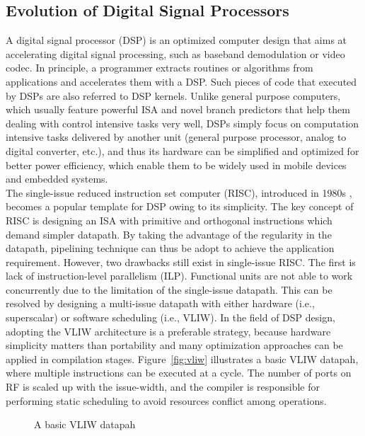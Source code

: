 \documentclass[12pt]{article}
\begin{document}
\begin{CJK}{UTF8}{bkai}
    \subsection{Evolution of Digital Signal Processors}
        A digital signal processor (DSP) is an optimized computer design that aims at accelerating digital signal processing, such as baseband demodulation or video codec.
        In principle, a programmer extracts routines or algorithms from applications and accelerates them with a DSP.
        Such pieces of code that executed by DSPs are also referred to DSP kernels.
        Unlike general purpose computers, which usually feature powerful ISA and novel branch predictors that help them dealing with control intensive tasks very well,
        DSPs simply focus on computation intensive tasks delivered by another unit (general purpose processor, analog to digital converter, etc.), 
        and thus its hardware can be simplified and optimized for better power efficiency, which enable them to be widely used in mobile devices and embedded systems.
        \\
        The single-issue reduced instruction set computer (RISC), introduced in 1980s \cite{risc}, becomes a popular template for DSP owing to its simplicity.
        The key concept of RISC is designing an ISA with primitive and orthogonal instructions which demand simpler datapath.
        By taking the advantage of the regularity in the datapath, pipelining technique can thus be adopt to achieve the application requirement.
        However, two drawbacks still exist in single-issue RISC. 
        The first is lack of instruction-level parallelism (ILP). 
        Functional units are not able to work concurrently due to the limitation of the single-issue datapath.
        This can be resolved by designing a multi-issue datapath with either hardware (i.e., superscalar) or software scheduling (i.e., VLIW).
        In the field of DSP design, adopting the VLIW architecture is a preferable strategy, 
        because hardware simplicity matters than portability and many optimization approaches can be applied in compilation stages. 
        Figure~\ref{fig:vliw} illustrates a basic VLIW datapah, where multiple instructions can be executed at a cycle.
        The number of ports on RF is scaled up with the issue-width, and the compiler is responsible for performing static scheduling to avoid resources conflict among operations.
        \begin{figure}[!ht] 
            \caption{A basic VLIW datapah}
            \centering

\end{figure}
\end{CJK}
\end{document}
